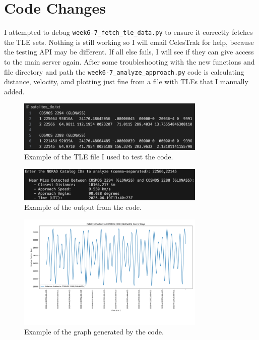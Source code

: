 \documentclass[12pt]{report}
\begin{document}
\chapter*{Code Changes}

I attempted to debug \texttt{week6-7\_fetch\_tle\_data.py} to ensure it correctly fetches the TLE sets. Nothing is still working so I will email CelesTrak for help, because the testing API may be different. If all else fails, I will see if they can give access to the main server again.
\newline \newline
After some troubleshooting with the new functions and file directory and path the \texttt{week6-7\_analyze\_approach.py} code is calculating distance, velocity, amd plotting just fine from a file with TLEs that I manually added.

\begin{figure}[H]
      \centering
      \includegraphics[width=0.8\textwidth]{figure_week_10_satellitestxt.png}
      \caption{Example of the TLE file I used to test the code.}
      \label{fig:satellitestxt}
\end{figure}

\begin{figure}[H]
      \centering
      \includegraphics[width=0.8\textwidth]{figure_week_10_output.png}
      \caption{Example of the output from the code.}
      \label{fig:output}
\end{figure}

\begin{figure}[H]
      \centering
      \includegraphics[width=0.8\textwidth]{figure_week_10_graph.png}
      \caption{Example of the graph generated by the code.}
      \label{fig:graph}
\end{figure}
\end{document}
